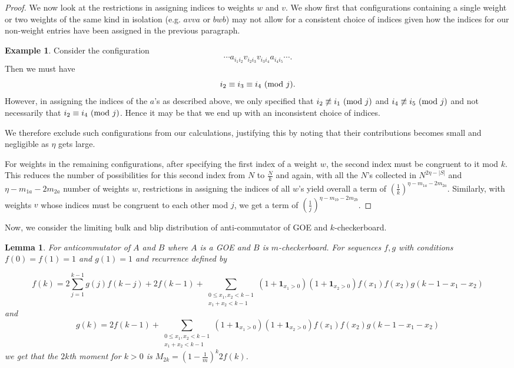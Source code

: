 \documentclass[12pt,reqno]{amsart}
\theoremstyle{plain} %
\newtheorem{lemma}[theorem]{Lemma}
\theoremstyle{remark}
\theoremstyle{definition}
\newtheorem{example}{Example}
\newcommand{\abs}[1]{\left|#1\right|}
\begin{document}
\begin{proof}
We now look at the restrictions in assigning indices to weights $w$ and $v$. We show first that configurations containing a single weight or two weights of the same kind in isolation (e.g. $avva$ or $bwb$) may not allow for a consistent choice of indices given how the indices for our non-weight entries have been assigned in the previous paragraph.

\begin{example}
    Consider the configuration $$\cdots a_{i_1i_2}v_{i_2i_3}v_{i_3i_4}a_{i_4i_5}\cdots.$$ Then we must have $$i_2 \equiv i_3 \equiv i_4 \textup{ (mod $j$)}.$$ 
    However, in assigning the indices of the $a$'s as described above, we only specified that $i_2 \not\equiv i_1 \textup{ (mod $j$)}$ and $i_4 \not\equiv i_5 \textup{ (mod $j$)}$ and not necessarily that $i_2 \equiv i_4 \textup{ (mod $j$)}$. Hence it may be that we end up with an inconsistent choice of indices.
\end{example}

We therefore exclude such configurations from our calculations, justifying this by noting that their contributions becomes small and negligible as $\eta$ gets large. 

For weights in the remaining configurations, after specifying the first index of a weight $w$, the second index must be congruent to it mod $k$. This reduces the number of possibilities for this second index from $N$ to $\frac{N}{k}$ and again, with all the $N$'s collected in $N^{2\eta-\abs{S}}$ and $\eta - m_{1a} - 2m_{2a}$ number of weights $w$, restrictions in assigning the indices of all $w$'s yield overall a term of $\left(\frac{1}{k}\right)^{\eta - m_{1a} - 2m_{2a}}$. Similarly, with weights $v$ whose indices must be congruent to each other mod $j$, we get a term of $\left(\frac{1}{j}\right)^{\eta - m_{1b} - 2m_{2b}}$.

\end{proof} 

Now, we consider the limiting bulk and blip distribution of anti-commutator of GOE and $k$-checkerboard.

\begin{lemma} For anticommutator of $A$ and $B$ where $A$ is a GOE and $B$ is $m$-checkerboard. For sequences $f,g$ with conditions $f(0)=f(1)=1$ and $g(1)=1$ and recurrence defined by

\[
f(k)=2\sum_{j=1}^{k-1}g(j)f(k-j) + 2f(k-1) + \sum_{\substack{0\leq x_1,x_2<k-1\\ x_1+x_2<k-1}}(1+\mathbf{1}_{x_1>0})(1+\mathbf{1}_{x_2>0})f(x_1)f(x_2)g(k-1-x_1-x_2)
\]
and 
\[
g(k)=2f(k-1) + \sum_{\substack{0\leq x_1,x_2<k-1\\ x_1+x_2<k-1}}(1+\mathbf{1}_{x_1>0})(1+\mathbf{1}_{x_2>0})f(x_1)f(x_2)g(k-1-x_1-x_2)
\]
we get that the $2k$th moment for $k>0$ is $M_{2k}=(1-\frac{1}{m})^{k}2f(k)$.
\end{lemma}
\end{document}
